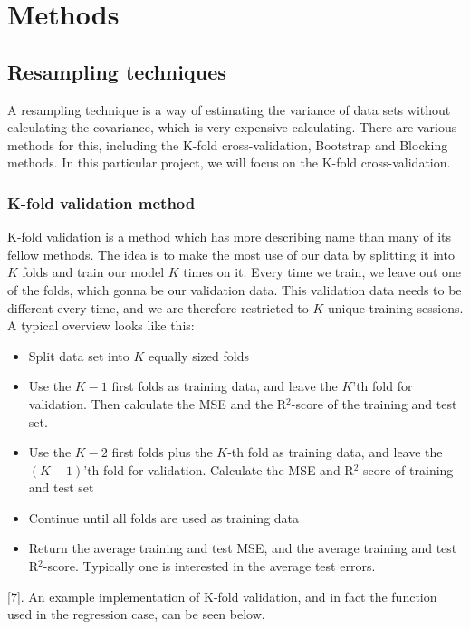 \section{Methods} \label{sec:methods}

\subsection{Resampling techniques} \label{sec:resampling}
A resampling technique is a way of estimating the variance of data sets without calculating the covariance, which is very expensive calculating. There are various methods for this, including the K-fold cross-validation, Bootstrap and Blocking methods. In this particular project, we will focus on the K-fold cross-validation.

\subsubsection{K-fold validation method} \label{sec:kfold}
K-fold validation is a method which has more describing name than many of its fellow methods. The idea is to make the most use of our data by splitting it into $K$ folds and train our model $K$ times on it. Every time we train, we leave out one of the folds, which gonna be our validation data. This validation data needs to be different every time, and we are therefore restricted to $K$ unique training sessions. A typical overview looks like this:
\begin{itemize}
	\item Split data set into $K$ equally sized folds
	\item Use the $K-1$ first folds as training data, and leave the $K$'th fold for validation. Then calculate the MSE and the R$^2$-score of the training and test set.
	\item Use the $K-2$ first folds plus the $K$-th fold as training data, and leave the $(K-1)$'th fold for validation. Calculate the MSE and R$^2$-score of training and test set
	\item Continue until all folds are used as training data
	\item Return the average training and test MSE, and the average training and test R$^2$-score. Typically one is interested in the average test errors. 
\end{itemize}
[7]. An example implementation of K-fold validation, and in fact the function used in the regression case, can be seen below.

